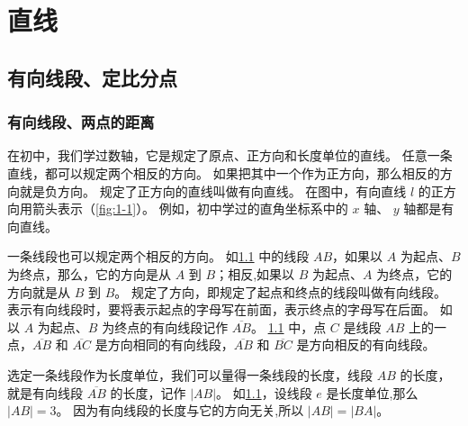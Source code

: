 \chapter{直线}\label{chp:line}
\section{有向线段、定比分点}
\subsection{有向线段、两点的距离}
在初中，我们学过数轴，它是规定了原点、正方向和长度单位的直线。
任意一条直线，都可以规定两个相反的方向。
如果把其中一个作为正方向，那么相反的方向就是负方向。
规定了正方向的直线叫做有向直线。
在图中，有向直线 $l$ 的正方向用箭头表示（\cref{fig:1-1}）。
例如，初中学过的直角坐标系中的 $x$ 轴、 $y$ 轴都是有向直线。
\begin{figure}
  \begin{minipage}[b]{0.48\linewidth}\centering
    \caption{}\label{fig:1-1}
  \end{minipage}
  \begin{minipage}[b]{0.48\linewidth}\centering
    \caption{}\label{fig:1-2}
  \end{minipage}
\end{figure}

一条线段也可以规定两个相反的方向。
如\cref{fig:1-2} 中的线段 $AB$，如果以 $A$ 为起点、$B$ 为终点，那么，它的方向是从 $A$ 到 $B$；相反,如果以 $B$ 为起点、$A$ 为终点，它的方向就是从 $B$ 到 $B$。
规定了方向，即规定了起点和终点的线段叫做有向线段。
表示有向线段时，要将表示起点的字母写在前面，表示终点的字母写在后面。
如以 $A$ 为起点、$B$ 为终点的有向线段记作 $\overline{AB}$。
\cref{fig:1-2} 中，点 $C$ 是线段 $AB$ 上的一点，$\overline{AB}$ 和 $\overline{AC}$ 是方向相同的有向线段，$\overline{AB}$ 和 $\overline{BC}$ 是方向相反的有向线段。

选定一条线段作为长度单位，我们可以量得一条线段的长度，线段 \({AB}\) 的长度，就是有向线段 $\overline{AB}$ 的长度，记作 $|AB|$。
如\cref{fig:1-2}，设线段 $e$ 是长度单位,那么 $|AB|=3$。
因为有向线段的长度与它的方向无关,所以 $|AB|=|BA|$。
\begin{figure}
  \begin{minipage}[b]{0.48\linewidth}\centering
    \caption{}\label{fig:1-3}
  \end{minipage}
  \begin{minipage}[b]{0.48\linewidth}\centering
    \caption{}\label{fig:1-4}
  \end{minipage}
\end{figure}

